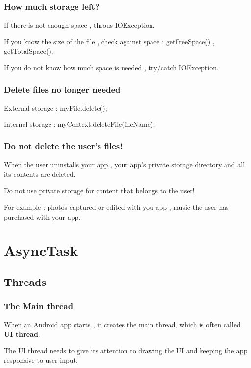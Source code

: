 \documentclass{article}
\begin{document}
\subsubsection{How much storage left?}

If there is not enough space , throus IOException.

If you know the size of the file , check against space : getFreeSpace() , getTotalSpace().

If you do not know how much space is needed , try/catch IOException.

\subsubsection{Delete files no longer needed}

External storage : myFile.delete();

Internal storage : myContext.deleteFile(fileName);

\subsubsection{Do not delete the user's files!}

When the user uninstalls your app , your app's private storage directory and all its contents are deleted.

Do not use private storage for content that belongs to the user!

For example : photos captured or edited with you app , music the user has purchased with your app.


\vspace{20mm}

\section{AsyncTask}

\subsection{Threads}

\subsubsection{The Main thread}

When an Android app starts , it creates the main thread, which is often called \textbf{UI thread}.

The UI thread needs to give its attention to drawing the UI and keeping the app responsive to user input.
\end{document}
